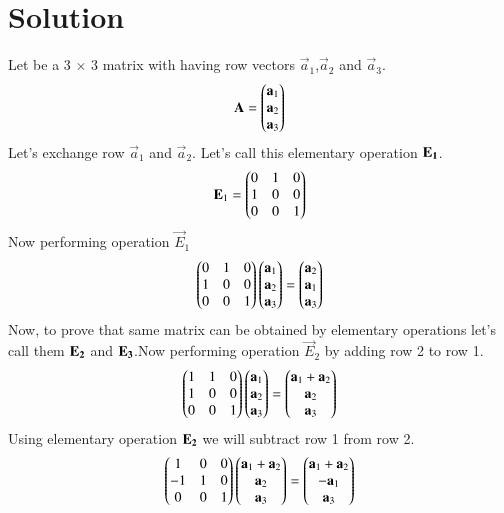 \documentclass[journal,12pt,twocolumn]{IEEEtran}
\begin{document}
 \section{\textbf{Solution}}
 Let  be a 3 $\times$ 3 matrix with having row vectors $\vec{a}_1$,$\vec{a}_2$ and $\vec{a}_3$.
 \begin{align}
 \mathbf{A}=\begin{pmatrix}\mathbf{a}_{1}\\\mathbf{a}_{2}\\\mathbf{a}_{3}\end{pmatrix}
   \end{align}
  Let's exchange row $\vec{a}_1$ and $\vec{a}_2$. Let's call this elementary operation $\bf{E}_1$.
  \begin{align}
  \mathbf{E}_1=\begin{pmatrix}0&1&0\\1&0&0\\0&0&1\end{pmatrix}\\
  \end{align}
  Now performing operation $ \vec{E}_1$
  \begin{align}
  \begin{pmatrix}0&1&0\\1&0&0\\0&0&1\end{pmatrix}\begin{pmatrix}\mathbf{a}_{1}\\\mathbf{a}_{2}\\\mathbf{a}_{3}\end{pmatrix}=
\begin{pmatrix}\mathbf{a}_2\\\mathbf{a}_1\\\mathbf{a}_3\end{pmatrix}\label{a}
  \end{align}
  Now, to prove that same matrix can be obtained by elementary operations let's call them $\bf{E}_2$ and $\bf{E}_3$.Now performing operation $ \vec{E}_2$ by adding row 2 to row 1.
  \begin{align}
  \begin{pmatrix}1&1&0\\1&0&0\\0&0&1\end{pmatrix}\begin{pmatrix}\mathbf{a}_{1}\\\mathbf{a}_{2}\\\mathbf{a}_{3}\end{pmatrix}
  =\begin{pmatrix}\mathbf{a}_1+\mathbf{a}_2\\\mathbf{a}_2\\\mathbf{a}_3\end{pmatrix}
  \end{align}
  Using elementary operation $\bf{E}_2$ we will subtract row 1 from row 2.
  \begin{align}
  \begin{pmatrix}1&0&0\\-1&1&0\\0&0&1\end{pmatrix}\begin{pmatrix}\mathbf{a}_1+\mathbf{a}_2\\\mathbf{a}_2\\\mathbf{a}_3\end{pmatrix}=
  \begin{pmatrix}\mathbf{a}_1+\mathbf{a}_2\\-\mathbf{a}_1\\\mathbf{a}_3\end{pmatrix}
  \end{align}
\end{document}
